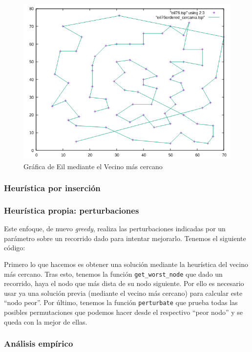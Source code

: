 \documentclass[10pt,a4paper]{article}
\begin{document}
\begin{itemize}
	\begin{figure}[h!]
	\centering
	\includegraphics[scale=0.5]{./Images/eil_cercania.png}
	\caption{Gráfica de Eil mediante el Vecino más cercano}
	\end{figure}
\end{itemize}

\subsubsection{Heurística por inserción}

\subsubsection{Heurística propia: perturbaciones}

Este enfoque, de nuevo \textit{greedy}, realiza las perturbaciones indicadas por un parámetro sobre un recorrido dado para intentar mejorarlo. Tenemos el siguiente código:


Primero lo que hacemos es obtener una solución mediante la heurística del vecino más cercano. Tras esto, tenemos la función \texttt{get\_worst\_node} que dado un recorrido, haya el nodo que más dista de su nodo siguiente. Por ello es necesario usar ya una solución previa (mediante el vecino más cercano) para calcular este ``nodo peor''. Por último, tenemos la función \texttt{perturbate} que prueba todas las posibles permutaciones que podemos hacer desde el respectivo ``peor nodo'' y se queda con la mejor de ellas.

\subsubsection*{Análisis empírico}
\end{document}
